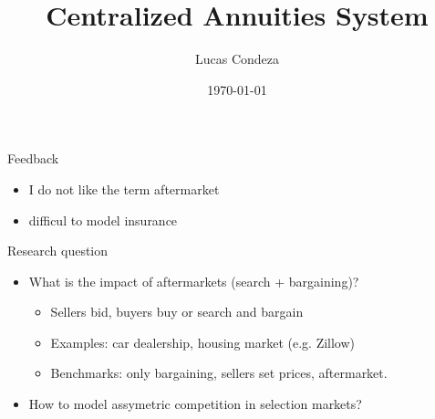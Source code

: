 \documentclass[notes, 10pt,aspectratio=169]{beamer}
\title{Centralized Annuities System}
\author{%
 Lucas Condeza
\inst{1} \and
}
\institute{
  \inst{1} Yale University \\
}
\date{\today}
\begin{document}
\begin{frame}
  \titlepage
\end{frame}

\begin{frame}{Feedback}

\begin{itemize}
    \item I do not like the term aftermarket 
    \item difficul to model insurance 
\end{itemize}

    
\end{frame}

\begin{frame}{Research question}
    
\begin{itemize}
    
    \item What is the impact of aftermarkets (search + bargaining)? 

    \begin{itemize}

    \item Sellers bid, buyers buy or search and bargain 
    
    \item Examples: car dealership, housing market (e.g. Zillow) 

    \item Benchmarks: only bargaining, sellers set prices, aftermarket. 
    
    \end{itemize}

    \item How to model assymetric competition in selection markets? 
\end{itemize}
\end{frame}
\end{document}
